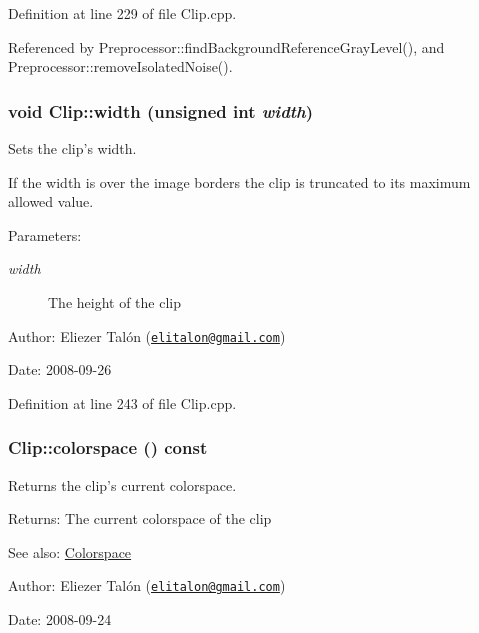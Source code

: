 Definition at line 229 of file Clip.cpp.

Referenced by Preprocessor::findBackgroundReferenceGrayLevel(), and Preprocessor::removeIsolatedNoise().\hypertarget{class_clip_17c1a23e159bedb6e2988235b8b568e7}{
\subsubsection[width]{\setlength{\rightskip}{0pt plus 5cm}void Clip::width (unsigned int {\em width})}}
\label{class_clip_17c1a23e159bedb6e2988235b8b568e7}


Sets the clip's width. 

If the width is over the image borders the clip is truncated to its maximum allowed value.

\begin{Desc}
\item[Parameters:]
\begin{description}
\item[{\em width}]The height of the clip\end{description}
\end{Desc}
\begin{Desc}
\item[Author:]Eliezer Talón (\href{mailto:elitalon@gmail.com}{\tt elitalon@gmail.com}) \end{Desc}
\begin{Desc}
\item[Date:]2008-09-26 \end{Desc}


Definition at line 243 of file Clip.cpp.\hypertarget{class_clip_e22de9122a399af67576eb114842846a}{
\subsubsection[colorspace]{ Clip::colorspace () const}}
\label{class_clip_e22de9122a399af67576eb114842846a}


Returns the clip's current colorspace. 

\begin{Desc}
\item[Returns:]The current colorspace of the clip\end{Desc}
\begin{Desc}
\item[See also:]\hyperlink{_colorspace_8h_7a7e24cdb2a27271343f0adceff89f65}{Colorspace}\end{Desc}
\begin{Desc}
\item[Author:]Eliezer Talón (\href{mailto:elitalon@gmail.com}{\tt elitalon@gmail.com}) \end{Desc}
\begin{Desc}
\item[Date:]2008-09-24 \end{Desc}


